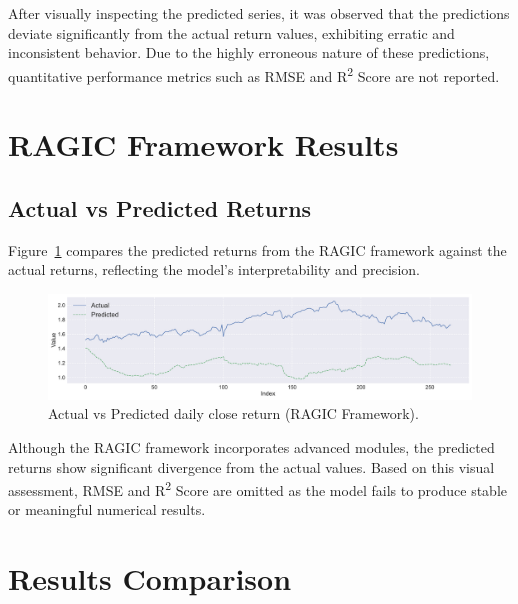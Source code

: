 \noindent After visually inspecting the predicted series, it was observed that the predictions deviate significantly from the actual return values, exhibiting erratic and inconsistent behavior. Due to the highly erroneous nature of these predictions, quantitative performance metrics such as RMSE and R\textsuperscript{2} Score are not reported.

\section{RAGIC Framework Results}
\subsection{Actual vs Predicted Returns}
Figure~\ref{fig:ragic_actual_vs_pred} compares the predicted returns from the RAGIC framework against the actual returns, reflecting the model’s interpretability and precision.

\begin{figure}[h!]
    \centering
    \includegraphics[width=\textwidth]{Images/9_Act_vs_Pred_Point.pdf}
    \caption{Actual vs Predicted daily close return (RAGIC Framework).}
    \label{fig:ragic_actual_vs_pred}
\end{figure}

\noindent Although the RAGIC framework incorporates advanced modules, the predicted returns show significant divergence from the actual values. Based on this visual assessment, RMSE and R\textsuperscript{2} Score are omitted as the model fails to produce stable or meaningful numerical results.

\section{Results Comparison}

